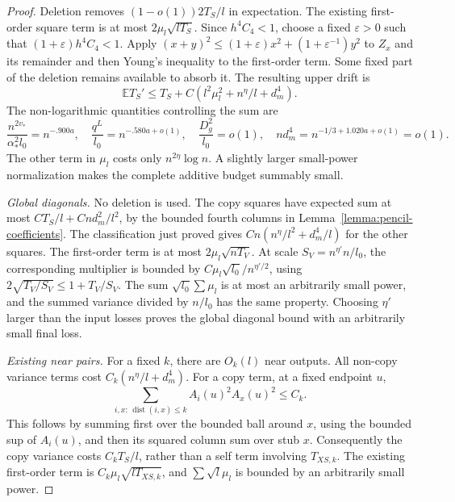 \begin{proof}
Deletion removes \((1-o(1))2T_S/l\) in expectation. The existing
first-order square term is at most
\(2\mu_l\sqrt{lT_S}\). Since \(h^4C_4<1\), choose a fixed
\(\varepsilon>0\) such that
\((1+\varepsilon)h^4C_4<1\). Apply
\((x+y)^2\le(1+\varepsilon)x^2+(1+\varepsilon^{-1})y^2\)
to \(Z_x\) and its remainder and then Young's inequality to the
first-order term. Some fixed part of the deletion remains available
to absorb it. The resulting upper drift is
\[
 \mathbb E T_S'\le T_S+
 C(l^2\mu_l^2+n^\eta/l+d_m^4).
\]
The non-logarithmic quantities controlling the sum are
\[
 \frac{n^{2v_*}}{\alpha_*^2l_0}=n^{-.900a},\quad
 \frac{q^L}{l_0}=n^{-.580a+o(1)},\quad
 \frac{D_g^2}{l_0}=o(1),\quad
 nd_m^4=n^{-1/3+1.020a+o(1)}=o(1).
\]
The other term in \(\mu_l\) costs only \(n^{2\eta}\log n\).
A slightly larger small-power normalization makes the complete
additive budget summably small.

\par\smallskip\noindent\textit{Global diagonals.}\quad
No deletion is used. The copy squares have expected sum at most
\(CT_S/l+Cnd_m^2/l^2\), by the bounded fourth columns in
Lemma~\ref{lemma:pencil-coefficients}. The classification just proved gives
\(Cn(n^\eta/l^2+d_m^4/l)\) for the other squares.
The first-order term is at most \(2\mu_l\sqrt{nT_V}\).
At scale \(S_V=n^{\eta'}n/l_0\), the corresponding multiplier is
bounded by
\(C\mu_l\sqrt{l_0}/n^{\eta'/2}\), using
\(2\sqrt{T_V/S_V}\le1+T_V/S_V\).
The sum \(\sqrt{l_0}\sum\mu_l\) is at most an arbitrarily
small power, and the summed variance divided by \(n/l_0\)
has the same property. Choosing \(\eta'\) larger than the input
losses proves the global diagonal bound with an arbitrarily small
final loss.

\par\smallskip\noindent\textit{Existing near pairs.}\quad
For a fixed \(k\), there are \(O_k(l)\) near outputs. All
non-copy variance terms cost \(C_k(n^\eta/l+d_m^4)\).
For a copy term, at a fixed endpoint \(u\),
\[
 \sum_{i,x:\,\operatorname{dist}(i,x)\le k}
           A_i(u)^2A_x(u)^2\le C_k.
\]
This follows by summing first over the bounded ball around \(x\),
using the bounded sup of \(A_i(u)\), and then its squared column
sum over stub \(x\). Consequently the copy variance costs
\(C_kT_S/l\), rather than a self term involving \(T_{XS,k}\).
The existing first-order term is
\(C_k\mu_l\sqrt{lT_{XS,k}}\), and
\(\sum\sqrt l\mu_l\) is bounded by an arbitrarily small power.


\end{proof}
